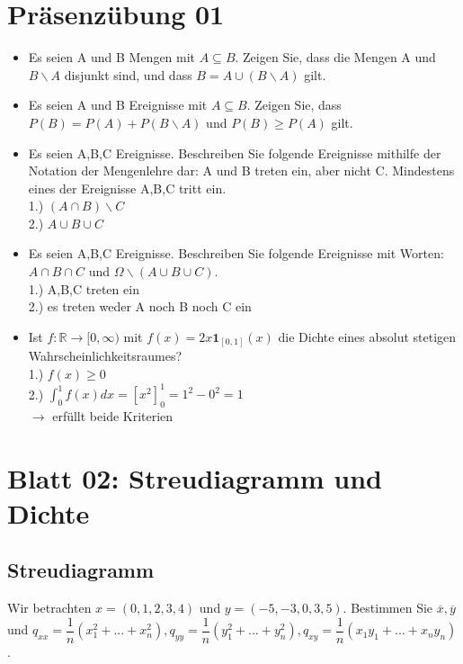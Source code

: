 \documentclass[paper=a4, fontsize=11pt]{scrartcl}
\numberwithin{equation}{section}
\numberwithin{figure}{section}
\numberwithin{table}{section}
\begin{document}
\section{Präsenzübung 01}
 \begin{itemize}
 \item Es seien A und B Mengen mit $A \subseteq B$. Zeigen Sie, dass die Mengen A und $B \backslash A$ disjunkt sind, und dass $B= A \cup (B \backslash A)$ gilt. \\
 \item Es seien A und B Ereignisse mit $A \subseteq B$. Zeigen Sie, dass $P(B)=P(A)+P(B \backslash A)$ und $P(B) \geq P(A)$ gilt. \\
 \item Es seien A,B,C Ereignisse. Beschreiben Sie folgende Ereignisse mithilfe der Notation der Mengenlehre dar: A und B treten ein, aber nicht C. Mindestens eines der Ereignisse A,B,C tritt ein. \\
 1.) $(A \cap B) \backslash C$ \\
 2.) $A \cup B \cup C$
\item Es seien A,B,C Ereignisse. Beschreiben Sie folgende Ereignisse mit Worten: $A \cap B \cap C$ und $\Omega \backslash (A \cup B \cup C)$. \\
1.) A,B,C treten ein \\
2.) es treten weder A noch B noch C  ein 
 \item Ist $f: \mathbb{R} \rightarrow [0, \infty)$ mit $f(x)=2x \textbf{1} _{[0,1]}(x)$ die Dichte eines absolut stetigen Wahrscheinlichkeitsraumes? \\
 1.) $f(x) \geq 0$ \\
 2.) $\int^{1}_{0} f(x) dx = [x^{2}]_{0}^{1}=1^{2}-0^{2}=1$ \\
 $\rightarrow$ erfüllt beide Kriterien
 \end{itemize}
\section{Blatt 02: Streudiagramm und Dichte}
\subsection{Streudiagramm}
Wir betrachten $x=(0,1,2,3,4)$ und $y=(-5,-3,0,3,5)$. Bestimmen Sie $\overline{x}, \overline{y}$ und $q_{xx}=\dfrac{1}{n} (x_{1}^{2}+...+x_{n}^{2}), q_{yy}=\dfrac{1}{n}(y_{1}^{2}+...+y_{n}^{2}), q_{xy}=\dfrac{1}{n}(x_{1}y_{1}+...+x_{n}y_{n})$. \\
\end{document}
